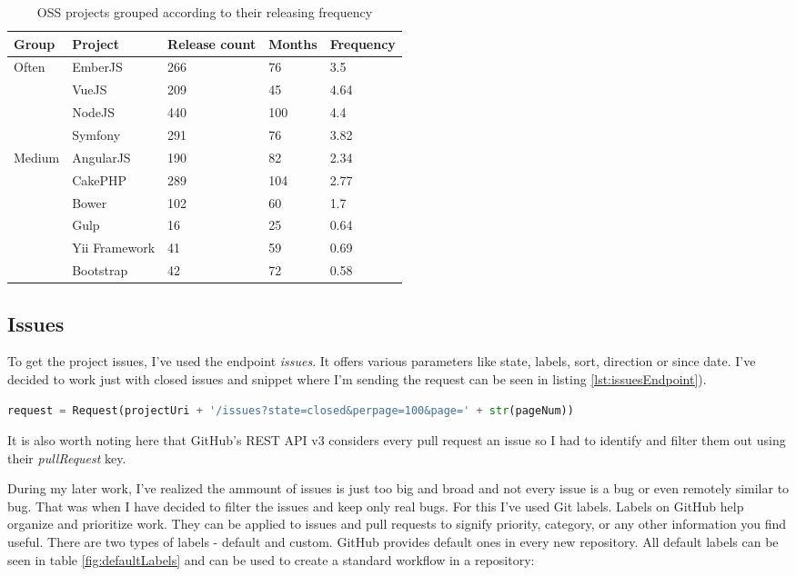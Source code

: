 \begin{table}[H]
\centering
\begin{tabular}{| p{2cm}|p{3cm}|p{3cm}|p{2cm}|p{3cm}|}
 \hline
\textbf{Group} & \textbf{ Project }& \textbf{Release count} & \textbf{ Months }& \textbf{Frequency}\\
 \hline
  \multirow{4}{*}{Often}   & EmberJS & 266   & 76 & 3.5\\ 
    & VueJS &  209 & 45 & 4.64 \\ 
    & NodeJS & 440 & 100 & 4.4\\  
    & Symfony & 291 & 76 & 3.82\\ \hline 
  \multirow{4}{*}{Medium}   & AngularJS & 190   & 82 & 2.34\\ 
    & CakePHP & 289 & 104 & 2.77\\ 
    & Bower &  102 & 60 & 1.7\\   \hline 
  \multirow{4}{*}{Seldom}   & Gulp & 16 & 25 & 0.64\\ 
    & Yii Framework & 41 & 59 & 0.69\\ 
    & Bootstrap &  42 & 72 & 0.58\\  \hline 
\end{tabular}
\caption{OSS projects grouped according to their releasing frequency}
\label{table:releaseGroupsCalculation}
\end{table}


\subsection{Issues} \label{ssec:issuesMining}
To get the project issues, I've used the endpoint \textit{issues}. It offers various parameters like state, labels, sort, direction or since date. I've decided to work just with closed issues and snippet where I'm sending the request can be seen in listing \ref{lst:issuesEndpoint}).

\begin{lstlisting}[caption={Requesting 100 closed issues},label={lst:issuesEndpoint},language=Python]
request = Request(projectUri + '/issues?state=closed&perpage=100&page=' + str(pageNum))
\end{lstlisting}

It is also worth noting here that GitHub's REST API v3 considers every pull request an issue so I had to identify and filter them out using their \textit{pullRequest} key.

During my later work, I've realized the ammount of issues is just too big and broad and not every issue is a bug or even remotely similar to bug. That was when I have decided to filter the issues and keep only real bugs. For this I've used Git labels. Labels on GitHub help organize and prioritize work. They can be applied to issues and pull requests to signify priority, category, or any other information you find useful. There are two types of labels - default and custom. GitHub provides default ones in every new repository. All default labels can be seen in table \ref{fig:defaultLabels} and can be used to create a standard workflow in a repository:

